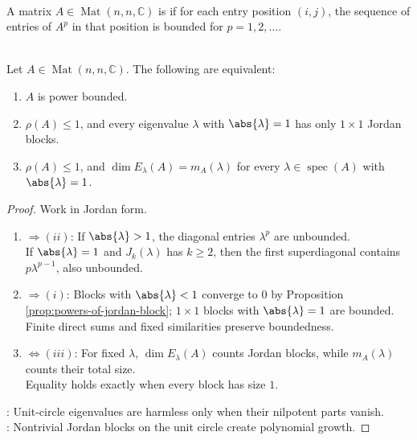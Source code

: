 \begin{definition} \label{def:power-bounded-matrix} \\
A matrix $A\in\operatorname{Mat}(n,n,\mathbb{C})$ is  if for each entry position $(i,j)$, the sequence of entries of $A^p$ in that position is bounded for $p=1,2,\ldots$.
\end{definition}

\begin{theorem} \label{thm:matrix-power-bounded-jordan-criterion} \\
Let $A\in\operatorname{Mat}(n,n,\mathbb{C})$. The following are equivalent:
\begin{enumerate}[label=(\roman*)]
\setlength{\itemsep}{0pt}
\item $A$ is power bounded.
\item $\rho(A)\leq1$, and every eigenvalue $\lambda$ with $\abs{\lambda}=1$ has only $1\times1$ Jordan blocks.
\item $\rho(A)\leq1$, and $\dim E_{\lambda}(A)=m_A(\lambda)$ for every $\lambda\in\operatorname{spec}(A)$ with $\abs{\lambda}=1$.
\end{enumerate}
\begin{proof}
Work in Jordan form.
\begin{enumerate}[label=(\roman*)]
\setlength{\itemsep}{0pt}
\item[$(i)$]$\Rightarrow(ii)$: If $\abs{\lambda}>1$, the diagonal entries $\lambda^p$ are unbounded.\\
If $\abs{\lambda}=1$ and $J_k(\lambda)$ has $k\geq2$, then the first superdiagonal contains $p\lambda^{p-1}$, also unbounded.
\item[$(ii)$]$\Rightarrow(i)$: Blocks with $\abs{\lambda}<1$ converge to $0$ by Proposition \ref{prop:powers-of-jordan-block}; $1\times1$ blocks with $\abs{\lambda}=1$ are bounded. Finite direct sums and fixed similarities preserve boundedness.
\item[$(ii)$]$\Leftrightarrow(iii)$: For fixed $\lambda$, $\dim E_{\lambda}(A)$ counts Jordan blocks, while $m_A(\lambda)$ counts their total size.\\
Equality holds exactly when every block has size $1$.
\end{enumerate}
: Unit-circle eigenvalues are harmless only when their nilpotent parts vanish.\\
: Nontrivial Jordan blocks on the unit circle create polynomial growth.
\end{proof}
\end{theorem}

